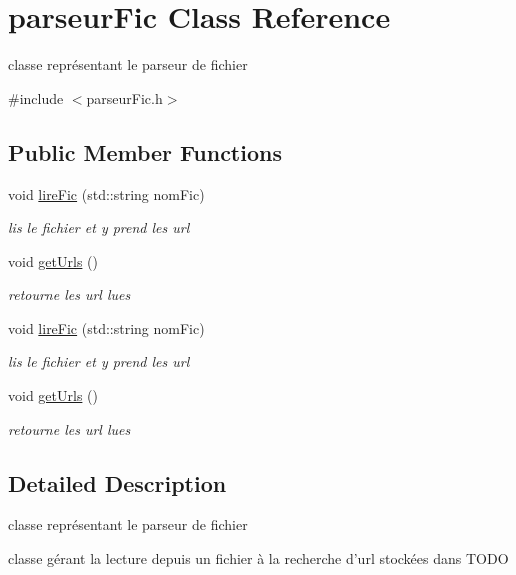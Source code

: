 \hypertarget{classparseur_fic}{\section{parseur\-Fic Class Reference}
\label{classparseur_fic}
}


classe représentant le parseur de fichier  




{\ttfamily \#include $<$parseur\-Fic.\-h$>$}

\subsection*{Public Member Functions}
\begin{DoxyCompactItemize}
\item 
void \hyperlink{classparseur_fic_a450d9c873d69b8bd2dfbaf7f932d7f3d}{lire\-Fic} (std\-::string nom\-Fic)
\begin{DoxyCompactList}\small\item\em lis le fichier et y prend les url \end{DoxyCompactList}\item 
void \hyperlink{classparseur_fic_adc2c9b439a72f44b33d699a2070ed98e}{get\-Urls} ()
\begin{DoxyCompactList}\small\item\em retourne les url lues \end{DoxyCompactList}\item 
void \hyperlink{classparseur_fic_a450d9c873d69b8bd2dfbaf7f932d7f3d}{lire\-Fic} (std\-::string nom\-Fic)
\begin{DoxyCompactList}\small\item\em lis le fichier et y prend les url \end{DoxyCompactList}\item 
void \hyperlink{classparseur_fic_adc2c9b439a72f44b33d699a2070ed98e}{get\-Urls} ()
\begin{DoxyCompactList}\small\item\em retourne les url lues \end{DoxyCompactList}\end{DoxyCompactItemize}


\subsection{Detailed Description}
classe représentant le parseur de fichier 

classe gérant la lecture depuis un fichier à la recherche d'url stockées dans T\-O\-D\-O 

